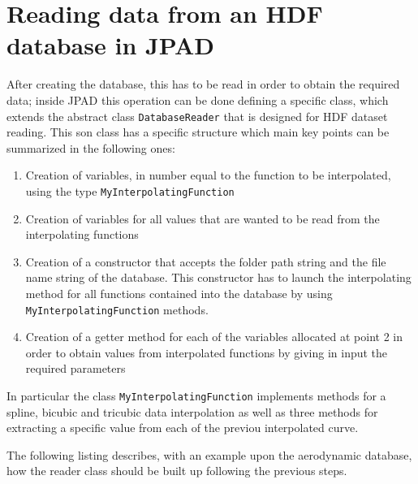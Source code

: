 \section{Reading data from an HDF database in JPAD}\label{par:Appendix2}
After creating the database, this has to be read in order to obtain the required data; inside JPAD this operation can be done defining a specific class, which extends the abstract class \lstinline[language=Java]!DatabaseReader! that is designed for HDF dataset reading. 
%
This son class has a specific structure which main key points can be summarized in the following ones:
%
\begin{enumerate}
\item Creation of variables, in number equal to the function to be interpolated, using the type \lstinline[language=Java]!MyInterpolatingFunction! 
\item Creation of variables for all values that are wanted to be read from the interpolating functions
\item Creation of a constructor that accepts the folder path string and the file name string of the database. This constructor has to launch the interpolating method for all functions contained into the database by using  \lstinline[language=Java]!MyInterpolatingFunction! methods.
\item Creation of a getter method for each of the variables allocated at point 2 in order to obtain values from interpolated functions by giving in input the required parameters
\end{enumerate}
%
\noindent
In particular the class \lstinline[language=Java]!MyInterpolatingFunction! implements methods for a spline, bicubic and tricubic data interpolation as well as three methods for extracting a specific value from each of the previou interpolated curve.

\bigskip
\noindent
The following listing describes, with an example upon the aerodynamic database, how the reader class should be built up following the previous steps.

